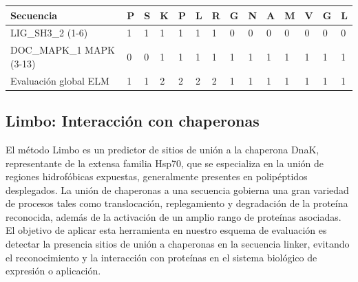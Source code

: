 \vspace{0.5cm}
\begin{adjustbox}{width=\textwidth}
\begin{tabular}{llllllllllllll} 
\hline
Secuencia & \textbf{P} & \textbf{S} & \textbf{K} & \textbf{P} & \textbf{L} & \textbf{R} & \textbf{G} & \textbf{N} & \textbf{A} & \textbf{M} & \textbf{V} & \textbf{G} & \textbf{L} \\ \hline
LIG\_SH3\_2 (1-6) 		& 1 & 1 & 1 & 1 & 1 & 1 & 0 & 0 & 0 & 0 & 0 & 0 & 0\\ \hline
DOC\_MAPK\_1 MAPK (3-13)  	& 0 & 0 & 1 & 1 & 1 & 1 & 1 & 1 & 1 & 1 & 1 & 1 & 1 \\ \hline
Evaluación global ELM 		& 1 & 1 & 2 & 2 & 2 & 2 & 1 & 1 & 1 & 1 & 1 & 1 & 1\\ \hline
\end{tabular}
\end{adjustbox}

























\subsection{Limbo: Interacción con chaperonas} \label{limbo}
El método Limbo \cite{van2009accurate} es un predictor de sitios de unión a la chaperona DnaK, representante de la extensa familia Hsp70, que se especializa en la unión de regiones hidrofóbicas expuestas, generalmente
presentes en polipéptidos desplegados. La unión de chaperonas a una secuencia gobierna una gran variedad de procesos tales como translocación, replegamiento y degradación de la proteína reconocida,
además de la activación de un amplio rango de proteínas asociadas.
El objetivo de aplicar esta herramienta en nuestro esquema de evaluación es detectar la presencia sitios de unión a chaperonas en la secuencia linker, 
evitando el reconocimiento y la interacción con proteínas en el sistema biológico de expresión o aplicación.

